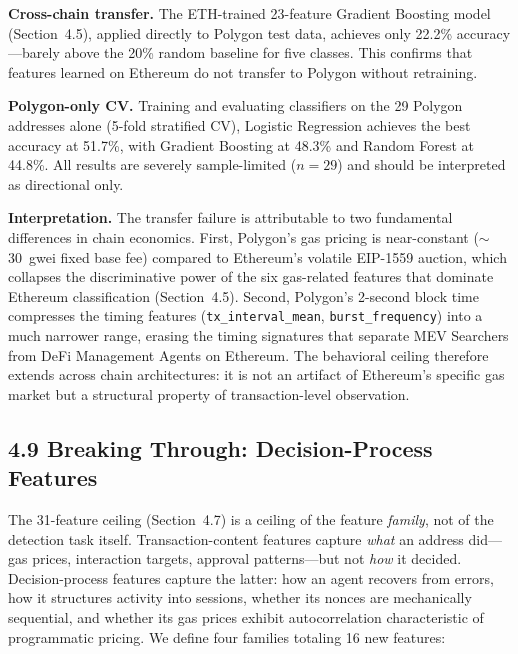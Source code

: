 \documentclass[sigconf,nonacm=false]{acmart}
\begin{document}
\textbf{Cross-chain transfer.} The ETH-trained 23-feature Gradient Boosting model (Section~4.5), applied directly to Polygon test data, achieves only 22.2\% accuracy---barely above the 20\% random baseline for five classes. This confirms that features learned on Ethereum do not transfer to Polygon without retraining.

\textbf{Polygon-only CV.} Training and evaluating classifiers on the 29 Polygon addresses alone (5-fold stratified CV), Logistic Regression achieves the best accuracy at 51.7\%, with Gradient Boosting at 48.3\% and Random Forest at 44.8\%. All results are severely sample-limited ($n = 29$) and should be interpreted as directional only.

\textbf{Interpretation.} The transfer failure is attributable to two fundamental differences in chain economics. First, Polygon's gas pricing is near-constant ($\sim$30~gwei fixed base fee) compared to Ethereum's volatile EIP-1559 auction, which collapses the discriminative power of the six gas-related features that dominate Ethereum classification (Section~4.5). Second, Polygon's 2-second block time compresses the timing features (\texttt{tx\_interval\_mean}, \texttt{burst\_frequency}) into a much narrower range, erasing the timing signatures that separate MEV Searchers from DeFi Management Agents on Ethereum. The behavioral ceiling therefore extends across chain architectures: it is not an artifact of Ethereum's specific gas market but a structural property of transaction-level observation.


\subsection{4.9 Breaking Through: Decision-Process Features}

The 31-feature ceiling (Section~4.7) is a ceiling of the feature \emph{family}, not of the detection task itself. Transaction-content features capture \emph{what} an address did---gas prices, interaction targets, approval patterns---but not \emph{how} it decided. Decision-process features capture the latter: how an agent recovers from errors, how it structures activity into sessions, whether its nonces are mechanically sequential, and whether its gas prices exhibit autocorrelation characteristic of programmatic pricing. We define four families totaling 16 new features:
\end{document}
